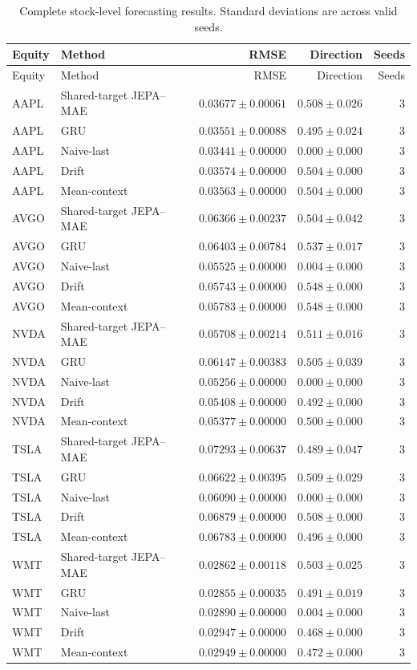 \begin{longtable}{llrrr}
\caption{Complete stock-level forecasting results. Standard deviations are across valid seeds.}\label{tab:appendix_stock_metrics}\\
\toprule
Equity & Method & RMSE & Direction & Seeds \\
\midrule
\endfirsthead
\toprule
Equity & Method & RMSE & Direction & Seeds \\
\midrule
\endhead
AAPL & Shared-target JEPA--MAE & $0.03677 \pm 0.00061$ & $0.508 \pm 0.026$ & 3 \\
AAPL & GRU & $0.03551 \pm 0.00088$ & $0.495 \pm 0.024$ & 3 \\
AAPL & Naive-last & $0.03441 \pm 0.00000$ & $0.000 \pm 0.000$ & 3 \\
AAPL & Drift & $0.03574 \pm 0.00000$ & $0.504 \pm 0.000$ & 3 \\
AAPL & Mean-context & $0.03563 \pm 0.00000$ & $0.504 \pm 0.000$ & 3 \\
AVGO & Shared-target JEPA--MAE & $0.06366 \pm 0.00237$ & $0.504 \pm 0.042$ & 3 \\
AVGO & GRU & $0.06403 \pm 0.00784$ & $0.537 \pm 0.017$ & 3 \\
AVGO & Naive-last & $0.05525 \pm 0.00000$ & $0.004 \pm 0.000$ & 3 \\
AVGO & Drift & $0.05743 \pm 0.00000$ & $0.548 \pm 0.000$ & 3 \\
AVGO & Mean-context & $0.05783 \pm 0.00000$ & $0.548 \pm 0.000$ & 3 \\
NVDA & Shared-target JEPA--MAE & $0.05708 \pm 0.00214$ & $0.511 \pm 0.016$ & 3 \\
NVDA & GRU & $0.06147 \pm 0.00383$ & $0.505 \pm 0.039$ & 3 \\
NVDA & Naive-last & $0.05256 \pm 0.00000$ & $0.000 \pm 0.000$ & 3 \\
NVDA & Drift & $0.05408 \pm 0.00000$ & $0.492 \pm 0.000$ & 3 \\
NVDA & Mean-context & $0.05377 \pm 0.00000$ & $0.500 \pm 0.000$ & 3 \\
TSLA & Shared-target JEPA--MAE & $0.07293 \pm 0.00637$ & $0.489 \pm 0.047$ & 3 \\
TSLA & GRU & $0.06622 \pm 0.00395$ & $0.509 \pm 0.029$ & 3 \\
TSLA & Naive-last & $0.06090 \pm 0.00000$ & $0.000 \pm 0.000$ & 3 \\
TSLA & Drift & $0.06879 \pm 0.00000$ & $0.508 \pm 0.000$ & 3 \\
TSLA & Mean-context & $0.06783 \pm 0.00000$ & $0.496 \pm 0.000$ & 3 \\
WMT & Shared-target JEPA--MAE & $0.02862 \pm 0.00118$ & $0.503 \pm 0.025$ & 3 \\
WMT & GRU & $0.02855 \pm 0.00035$ & $0.491 \pm 0.019$ & 3 \\
WMT & Naive-last & $0.02890 \pm 0.00000$ & $0.004 \pm 0.000$ & 3 \\
WMT & Drift & $0.02947 \pm 0.00000$ & $0.468 \pm 0.000$ & 3 \\
WMT & Mean-context & $0.02949 \pm 0.00000$ & $0.472 \pm 0.000$ & 3 \\
\bottomrule
\end{longtable}
